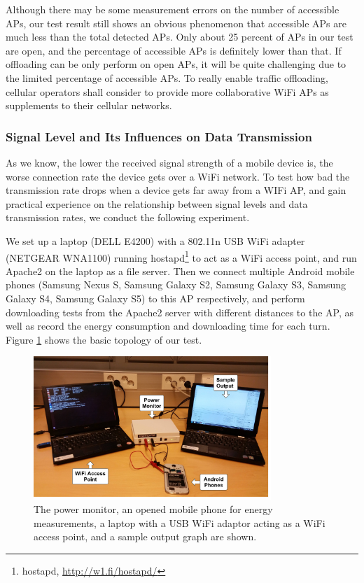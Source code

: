 \documentclass[english]{tktltiki}
\begin{document}
Although there may be some measurement errors on the number of accessible APs, our test result still shows an obvious phenomenon that accessible APs are much less than the total detected APs. Only about 25 percent of APs in our test are open, and the percentage of accessible APs is definitely lower than that. If offloading can be only perform on open APs, it will be quite challenging due to the limited percentage of accessible APs. To really enable traffic offloading, cellular operators shall consider to provide more collaborative WiFi APs as supplements to their cellular networks. 



\subsubsection{Signal Level and Its Influences on Data Transmission}

As we know, the lower the received signal strength of a mobile device is, the worse connection rate the device gets over a WiFi network. To test how bad the transmission rate drops when a device gets far away from a WIFi AP, and gain practical experience on the relationship between signal levels and data transmission rates, we conduct the following experiment.

We set up a laptop (DELL E4200) with a 802.11n USB WiFi adapter (NETGEAR WNA1100) running hostapd\footnote[10]{hostapd, \url{http://w1.fi/hostapd/}} to act as a WiFi access point, and run Apache2 on the laptop as a file server. Then we connect multiple Android mobile phones (Samsung Nexus S, Samsung Galaxy S2, Samsung Galaxy S3, Samsung Galaxy S4, Samsung Galaxy S5) to this AP respectively, and perform downloading tests from the Apache2 server with different distances to the AP, as well as record the energy consumption and downloading time for each turn. Figure \ref{fig:signal-level-topo} shows the basic topology of our test.

\begin{figure}[htbp]
  \centering
  \includegraphics[width=0.8\textwidth]{images/signal-level-topo.jpg}
  \caption{The power monitor, an opened mobile phone for energy measurements, a laptop with a USB WiFi adaptor acting as a WiFi access point, and a sample output graph are shown.}
  \label{fig:signal-level-topo}
\end{figure}
\end{document}
